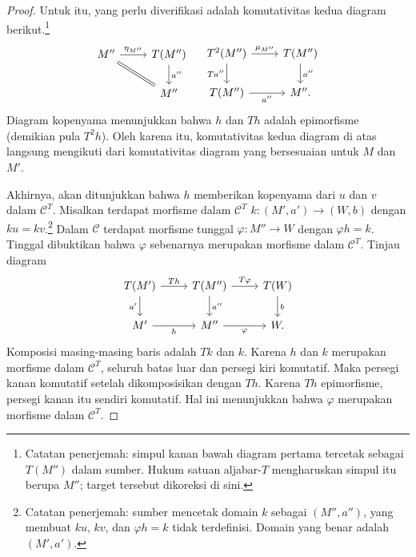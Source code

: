 \begin{proof}
	Untuk itu, yang perlu diverifikasi adalah komutativitas kedua diagram
	berikut.\footnote{Catatan penerjemah: simpul kanan bawah diagram pertama
	tercetak sebagai $T(M'')$ dalam sumber. Hukum satuan aljabar-$T$ mengharuskan
	simpul itu berupa $M''$; target tersebut dikoreksi di sini.}
	\[\begin{tikzcd}
		M'' \arrow[r, "{\eta_{M''}}"] \arrow[equal, rd] & T(M'') \arrow[d, "{a''}"] \\
		& M''
	\end{tikzcd} \quad
	\begin{tikzcd}
		T^2(M'') \arrow[r, "{\mu_{M''}}"] \arrow[d, "{Ta''}"'] & T(M'') \arrow[d, "{a''}"] \\
		T(M'') \arrow[r, "{a''}"'] & M'' .
	\end{tikzcd}\]
	Diagram kopenyama menunjukkan bahwa $h$ dan $Th$ adalah epimorfisme
	(demikian pula $T^2h$). Oleh karena itu, komutativitas kedua diagram di atas
	langsung mengikuti dari komutativitas diagram yang bersesuaian untuk $M$
	dan $M'$.

	Akhirnya, akan ditunjukkan bahwa $h$ memberikan kopenyama dari $u$ dan $v$
	dalam $\mathcal{C}^T$. Misalkan terdapat morfisme dalam $\mathcal{C}^T$
	$k:(M',a')\to(W,b)$ dengan $ku=kv$.\footnote{Catatan penerjemah: sumber
	mencetak domain $k$ sebagai $(M'',a'')$, yang membuat $ku$, $kv$, dan
	$\varphi h=k$ tidak terdefinisi. Domain yang benar adalah $(M',a')$.}
	Dalam $\mathcal{C}$ terdapat morfisme tunggal $\varphi:M''\to W$ dengan
	$\varphi h=k$. Tinggal dibuktikan bahwa $\varphi$ sebenarnya merupakan
	morfisme dalam $\mathcal{C}^T$. Tinjau diagram
	\[\begin{tikzcd}
		T(M') \arrow[r, "Th"] \arrow[d, "{a'}"'] & T(M'') \arrow[r, "T\varphi"] \arrow[d, "{a''}"] & T(W) \arrow[d, "b"] \\
		M' \arrow[r, "h"'] & M'' \arrow[r, "\varphi"'] & W.
	\end{tikzcd}\]
	Komposisi masing-masing baris adalah $Tk$ dan $k$. Karena $h$ dan $k$
	merupakan morfisme dalam $\mathcal{C}^T$, seluruh batas luar dan persegi
	kiri komutatif. Maka persegi kanan komutatif setelah dikomposisikan dengan
	$Th$. Karena $Th$ epimorfisme, persegi kanan itu sendiri komutatif. Hal ini
	menunjukkan bahwa $\varphi$ merupakan morfisme dalam $\mathcal{C}^T$.
\end{proof}

